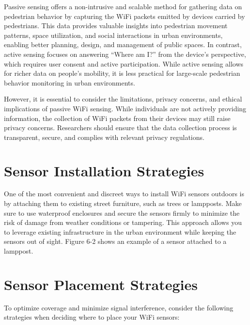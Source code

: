 \documentclass[
  letterpaper,
]{scrbook}
\begin{document}
Passive sensing offers a non-intrusive and scalable method for gathering
data on pedestrian behavior by capturing the WiFi packets emitted by
devices carried by pedestrians. This data provides valuable insights
into pedestrian movement patterns, space utilization, and social
interactions in urban environments, enabling better planning, design,
and management of public spaces. In contrast, active sensing focuses on
answering ``Where am I?'' from the device's perspective, which requires
user consent and active participation. While active sensing allows for
richer data on people's mobility, it is less practical for large-scale
pedestrian behavior monitoring in urban environments.

However, it is essential to consider the limitations, privacy concerns,
and ethical implications of passive WiFi sensing. While individuals are
not actively providing information, the collection of WiFi packets from
their devices may still raise privacy concerns. Researchers should
ensure that the data collection process is transparent, secure, and
complies with relevant privacy regulations.

\hypertarget{sensor-installation-strategies}{%
\section{Sensor Installation
Strategies}\label{sensor-installation-strategies}}

One of the most convenient and discreet ways to install WiFi sensors
outdoors is by attaching them to existing street furniture, such as
trees or lampposts. Make sure to use waterproof enclosures and secure
the sensors firmly to minimize the risk of damage from weather
conditions or tampering. This approach allows you to leverage existing
infrastructure in the urban environment while keeping the sensors out of
sight. Figure 6-2 shows an example of a sensor attached to a lamppost.

\hypertarget{sensor-placement-strategies}{%
\section{Sensor Placement
Strategies}\label{sensor-placement-strategies}}

To optimize coverage and minimize signal interference, consider the
following strategies when deciding where to place your WiFi sensors:
\end{document}
